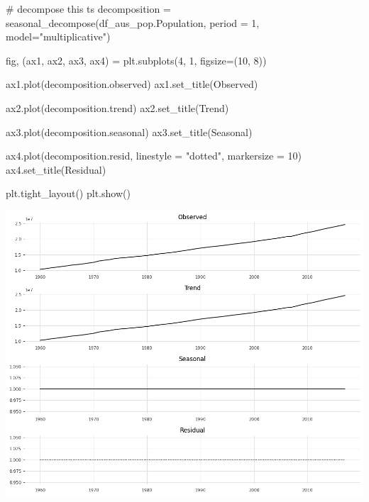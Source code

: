 \documentclass[
  11pt,
]{article}
\newenvironment{Shaded}{\begin{snugshade}}{\end{snugshade}}
\newcommand{\CommentTok}[1]{\textcolor[rgb]{0.37,0.37,0.37}{#1}}
\newcommand{\DecValTok}[1]{\textcolor[rgb]{0.68,0.00,0.00}{#1}}
\newcommand{\NormalTok}[1]{\textcolor[rgb]{0.00,0.23,0.31}{#1}}
\newcommand{\OperatorTok}[1]{\textcolor[rgb]{0.37,0.37,0.37}{#1}}
\newcommand{\StringTok}[1]{\textcolor[rgb]{0.13,0.47,0.30}{#1}}
\begin{document}
\begin{Shaded}
\begin{Highlighting}[]
\CommentTok{\# decompose this ts }
\NormalTok{decomposition }\OperatorTok{=}\NormalTok{ seasonal\_decompose(df\_aus\_pop.Population, period }\OperatorTok{=} \DecValTok{1}\NormalTok{, model}\OperatorTok{=}\StringTok{"multiplicative"}\NormalTok{)}

\NormalTok{fig, (ax1, ax2, ax3, ax4) }\OperatorTok{=}\NormalTok{ plt.subplots(}\DecValTok{4}\NormalTok{, }\DecValTok{1}\NormalTok{, figsize}\OperatorTok{=}\NormalTok{(}\DecValTok{10}\NormalTok{, }\DecValTok{8}\NormalTok{))}

\NormalTok{ax1.plot(decomposition.observed)}
\NormalTok{ax1.set\_title(}\StringTok{\textquotesingle{}Observed\textquotesingle{}}\NormalTok{)}

\NormalTok{ax2.plot(decomposition.trend)}
\NormalTok{ax2.set\_title(}\StringTok{\textquotesingle{}Trend\textquotesingle{}}\NormalTok{)}

\NormalTok{ax3.plot(decomposition.seasonal)}
\NormalTok{ax3.set\_title(}\StringTok{\textquotesingle{}Seasonal\textquotesingle{}}\NormalTok{)}

\NormalTok{ax4.plot(decomposition.resid, linestyle }\OperatorTok{=} \StringTok{"dotted"}\NormalTok{, markersize }\OperatorTok{=} \DecValTok{10}\NormalTok{)}
\NormalTok{ax4.set\_title(}\StringTok{\textquotesingle{}Residual\textquotesingle{}}\NormalTok{)}

\NormalTok{plt.tight\_layout()}
\NormalTok{plt.show()}
\end{Highlighting}
\end{Shaded}

\includegraphics{hw3_files/figure-pdf/cell-7-output-1.png}
\end{document}

